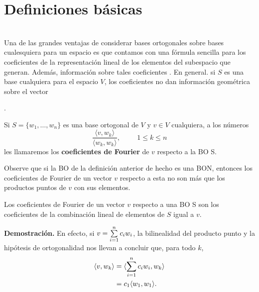 \section{Definiciones básicas}


 \\



Una de las
grandes ventajas de considerar
bases ortogonales sobre bases cualesquiera para un espacio es que
contamos con una fórmula sencilla
para los coeficientes de la representación lineal de los
elementos del subespacio que generan. Además, información
sobre tales coeficientes .
En general. si $S$ es una base cualquiera para
el espacio $V$, los coeficientes no dan información
geométrica sobre el vector  \\
 

. 
 
 
 
 
\begin{defi}
Si $S=\{ w_{1}, \ldots , w_{n} \}$ es una base
ortogonal de $V$ y $v \in V$ cualquiera, a los
números
\[
\frac{\langle v , w_{k} \rangle}{\langle  w_{k}, w_{k} \rangle},
\hspace{1cm} 1 \leq k \leq n
\]
les llamaremos los \textbf{coeficientes de Fourier}
de $v$ respecto a la BO S.
\end{defi}

Observe que si la BO de la definición anterior de hecho
es una BON, entonces los coeficientes de Fourier de un 
vector $v$ respecto a esta no son más que los productos
puntos de $v$ con sus elementos.

\begin{prop}
Los coeficientes de Fourier de un vector $v$
respecto a una BO S son los coeficientes
de la combinación lineal de elementos de $S$ igual a $v$.
\end{prop}
\noindent
\textbf{Demostración.}
En efecto, si $v=\sum\limits_{i=1}^{n}c_{i}w_{i}$,
la bilinealidad del producto punto y la hipótesis 
de ortogonalidad nos llevan a concluir que, 
para todo $k$,
\begin{align*}
\langle  v , w_{k} \rangle &= \langle \sum\limits_{i=1}^{n}c_{i}w_{i}  , w_{k} \rangle \\
& = c_{1} \langle w_{1}  , w_{1} \rangle.
\end{align*}
\QEDB
\vspace{0.2cm}




